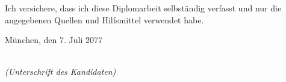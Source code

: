 \begin{large}

\vspace*{2cm}
\noindent
Ich versichere, dass ich diese Diplomarbeit %
selbständig verfasst und nur die angegebenen Quellen und Hilfsmittel verwendet habe.

\vspace{2cm}

\noindent
München, den 7. Juli 2077

\vspace{3cm}

\hspace*{7cm}%
\dotfill\\
\hspace*{8.5cm}%
\textit{(Unterschrift des Kandidaten)}

\end{large}
